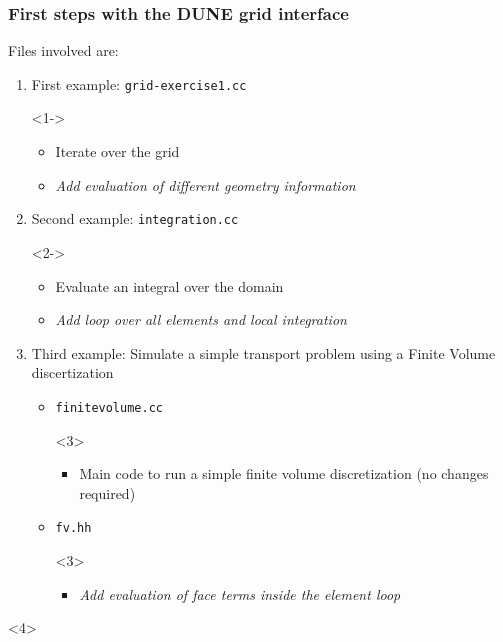 \documentclass[aspectratio=169,11pt]{beamer}
\theoremstyle{definition}
\newcommand{\blackframe}{
}
\begin{document}
\begin{frame}
\frametitle{First steps with the DUNE grid interface}
Files involved are:
\begin{enumerate}[1)]
\item First example: \lstinline{grid-exercise1.cc}
  \begin{uncoverenv}<1->
    \begin{itemize}
    \item Iterate over the grid
    \item \emph{Add evaluation of different geometry information}
    \end{itemize}
  \end{uncoverenv}
\item Second example: \lstinline{integration.cc}
  \begin{uncoverenv}<2->
    \begin{itemize}
    \item Evaluate an integral over the domain
    \item \emph{Add loop over all elements and local integration}
    \end{itemize}
  \end{uncoverenv}
\item Third example: Simulate a simple transport problem using a
  Finite Volume discertization\\
  \begin{itemize}
  \item \lstinline{finitevolume.cc}
  \begin{uncoverenv}<3>
    \begin{itemize}
    \item Main code to run a simple finite volume discretization (no
      changes required)
    \end{itemize}
  \end{uncoverenv}
\item \lstinline{fv.hh}
  \begin{uncoverenv}<3>
    \begin{itemize}
    \item \emph{Add evaluation of face terms inside the element loop}
    \end{itemize}
  \end{uncoverenv}
  \end{itemize}
\end{enumerate}
\begin{uncoverenv}<4>
\end{uncoverenv}
\end{frame}

\blackframe
\end{document}

